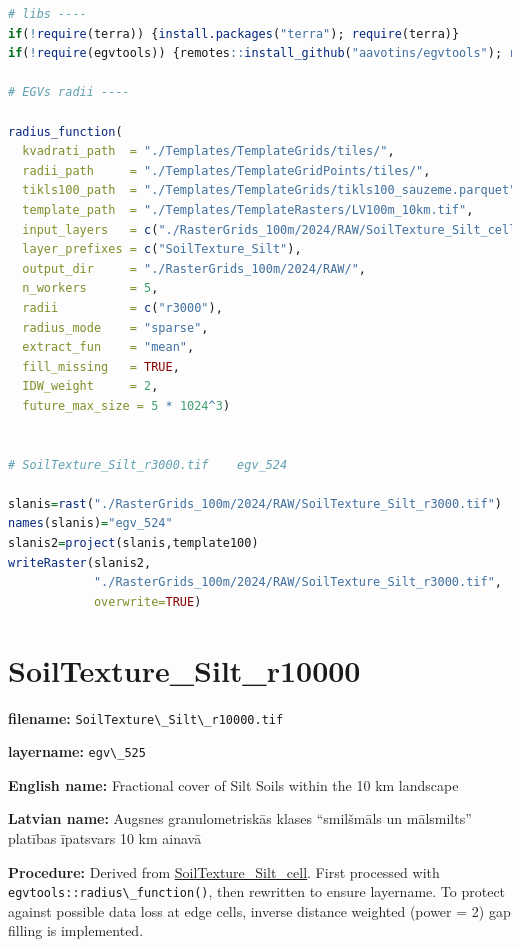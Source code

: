 \documentclass[
]{book}
\newcommand{\passthrough}[1]{#1}
\begin{document}
\begin{lstlisting}[language=R]
# libs ----
if(!require(terra)) {install.packages("terra"); require(terra)}
if(!require(egvtools)) {remotes::install_github("aavotins/egvtools"); require(egvtools)}

# EGVs radii ----

radius_function(
  kvadrati_path  = "./Templates/TemplateGrids/tiles/",
  radii_path     = "./Templates/TemplateGridPoints/tiles/",
  tikls100_path  = "./Templates/TemplateGrids/tikls100_sauzeme.parquet",
  template_path  = "./Templates/TemplateRasters/LV100m_10km.tif",
  input_layers   = c("./RasterGrids_100m/2024/RAW/SoilTexture_Silt_cell.tif"),
  layer_prefixes = c("SoilTexture_Silt"),
  output_dir     = "./RasterGrids_100m/2024/RAW/",
  n_workers      = 5,
  radii          = c("r3000"),
  radius_mode    = "sparse",
  extract_fun    = "mean",
  fill_missing   = TRUE,
  IDW_weight     = 2,
  future_max_size = 5 * 1024^3)


# SoilTexture_Silt_r3000.tif    egv_524

slanis=rast("./RasterGrids_100m/2024/RAW/SoilTexture_Silt_r3000.tif")
names(slanis)="egv_524"
slanis2=project(slanis,template100)
writeRaster(slanis2,
            "./RasterGrids_100m/2024/RAW/SoilTexture_Silt_r3000.tif",
            overwrite=TRUE)
\end{lstlisting}

\section{SoilTexture\_Silt\_r10000}\label{ch06.525}

\textbf{filename:} \passthrough{\lstinline!SoilTexture\_Silt\_r10000.tif!}

\textbf{layername:} \passthrough{\lstinline!egv\_525!}

\textbf{English name:} Fractional cover of Silt Soils within the 10 km landscape

\textbf{Latvian name:} Augsnes granulometriskās klases ``smilšmāls un mālsmilts'' platības īpatsvars 10 km ainavā

\textbf{Procedure:} Derived from \hyperref[ch06.521]{SoilTexture\_Silt\_cell}. First processed
with \passthrough{\lstinline!egvtools::radius\_function()!}, then rewritten to ensure layername. To protect against
possible data loss at edge cells, inverse distance weighted (power = 2) gap filling
is implemented.
\end{document}
